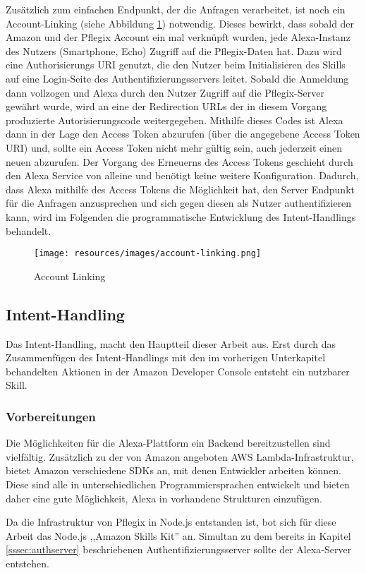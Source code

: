 Zusätzlich zum einfachen Endpunkt, der die Anfragen verarbeitet, ist noch ein Account-Linking (siehe Abbildung \ref{fig:linking}) notwendig. Dieses bewirkt, dass sobald der Amazon und der Pflegix Account ein mal verknüpft wurden, jede Alexa-Instanz des Nutzers (Smartphone, Echo) Zugriff auf die Pflegix-Daten hat. Dazu wird eine Authorisierungs URI genutzt, die den Nutzer beim Initialisieren des Skills auf eine Login-Seite des Authentifizierungsservers leitet. Sobald die Anmeldung dann vollzogen und Alexa durch den Nutzer Zugriff auf die Pflegix-Server gewährt wurde, wird an eine der Redirection URLs der in diesem Vorgang produzierte Autorisierungscode weitergegeben. Mithilfe dieses Codes ist Alexa dann in der Lage den Access Token abzurufen (über die angegebene Access Token URI) und, sollte ein Access Token nicht mehr gültig sein, auch jederzeit einen neuen abzurufen.
Der Vorgang des Erneuerns des Access Tokens geschieht durch den Alexa Service von alleine und benötigt keine weitere Konfiguration.
Dadurch, dass Alexa mithilfe des Access Tokens die Möglichkeit hat, den Server Endpunkt für die Anfragen anzusprechen und sich gegen diesen als Nutzer authentifizieren kann, wird im Folgenden die programmatische Entwicklung des Intent-Handlings behandelt.
\begin{figure} [H]
    \texttt{[image: resources/images/account-linking.png]}
    \caption{Account Linking}
    \label{fig:linking}
\end{figure}

\subsection{Intent-Handling}
Das Intent-Handling, macht den Hauptteil dieser Arbeit aus. Erst durch das Zusammenfügen des Intent-Handlings mit den im vorherigen Unterkapitel behandelten Aktionen in der Amazon Developer Console entsteht ein nutzbarer Skill.
\subsubsection{Vorbereitungen}
Die Möglichkeiten für die Alexa-Plattform ein Backend bereitzustellen sind vielfältig. Zusätzlich zu der von Amazon angeboten AWS Lambda-Infrastruktur, bietet Amazon verschiedene SDKs an, mit denen Entwickler arbeiten können. Diese sind alle in unterschiedlichen Programmiersprachen entwickelt und bieten daher eine gute Möglichkeit, Alexa in vorhandene Strukturen einzufügen.

Da die Infrastruktur von Pflegix in Node.js entstanden ist, bot sich für diese Arbeit das Node.js ,,Amazon Skills Kit'' an.
Simultan zu dem bereits in Kapitel \ref{sssec:authserver} beschriebenen Authentifizierungsserver sollte der Alexa-Server entstehen.
